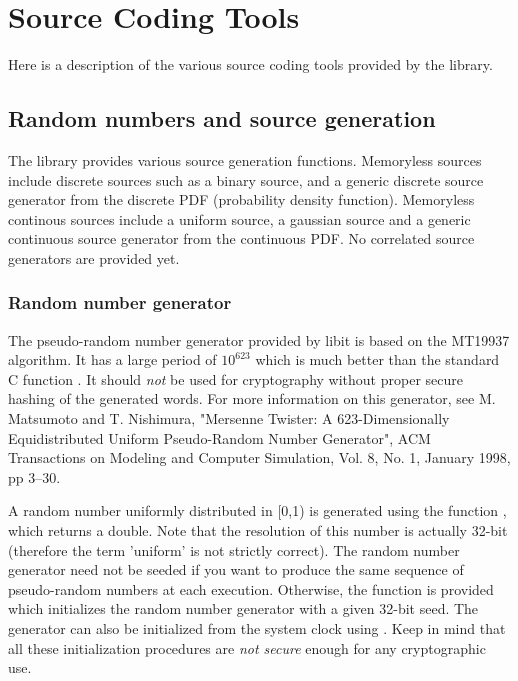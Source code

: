 \chapter{Source Coding Tools}

      Here is a description of the various source coding tools
      provided by the library.


\section{Random numbers and source generation}

    The library provides various source generation
    functions. Memoryless sources include discrete sources such as a
    binary source, and a generic discrete source generator from the
    discrete PDF (probability density function). Memoryless
    continous sources include a uniform source, a gaussian source and
    a generic continuous source generator from the continuous
    PDF. No correlated source generators are provided yet.


\subsection{Random number generator}

    The pseudo-random number generator provided by libit is based on
  the MT19937 algorithm. It has a large period of $10^{623}$ which is much
  better than the standard C function . It should
  \emph{not} be used for cryptography without proper
  secure hashing of the generated words. For more information on this
  generator, see M. Matsumoto and T. Nishimura, "Mersenne Twister: A
  623-Dimensionally Equidistributed Uniform Pseudo-Random Number
  Generator", ACM Transactions on Modeling and Computer Simulation,
  Vol. 8, No. 1, January 1998, pp 3--30.  

    A random number uniformly distributed in [0,1) is generated using the function
    , which returns a double. Note that the
    resolution of this number is actually 32-bit (therefore the term
    'uniform' is not strictly correct). The random number generator
    need not be seeded if you want to produce the same sequence of
    pseudo-random numbers at each execution. Otherwise, the function
     is provided which initializes the random
    number generator with a given 32-bit seed. The generator can also
    be initialized from the system clock using
    . Keep in mind that all these
    initialization procedures are \emph{not secure} enough for any
    cryptographic use.


